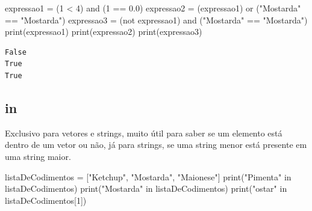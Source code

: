 \documentclass[
  letterpaper,
  DIV=11,
  numbers=noendperiod]{scrreprt}
\newenvironment{Shaded}{\begin{snugshade}}{\end{snugshade}}
\newcommand{\BuiltInTok}[1]{\textcolor[rgb]{0.00,0.23,0.31}{#1}}
\newcommand{\DecValTok}[1]{\textcolor[rgb]{0.68,0.00,0.00}{#1}}
\newcommand{\FloatTok}[1]{\textcolor[rgb]{0.68,0.00,0.00}{#1}}
\newcommand{\KeywordTok}[1]{\textcolor[rgb]{0.00,0.23,0.31}{#1}}
\newcommand{\NormalTok}[1]{\textcolor[rgb]{0.00,0.23,0.31}{#1}}
\newcommand{\OperatorTok}[1]{\textcolor[rgb]{0.37,0.37,0.37}{#1}}
\newcommand{\StringTok}[1]{\textcolor[rgb]{0.13,0.47,0.30}{#1}}
\begin{document}
\begin{Shaded}
\begin{Highlighting}[]
\NormalTok{    expressao1 }\OperatorTok{=}\NormalTok{ (}\DecValTok{1} \OperatorTok{\textless{}} \DecValTok{4}\NormalTok{) }\KeywordTok{and}\NormalTok{ (}\DecValTok{1} \OperatorTok{==} \FloatTok{0.0}\NormalTok{)}
\NormalTok{    expressao2 }\OperatorTok{=}\NormalTok{ (expressao1) }\KeywordTok{or}\NormalTok{ (}\StringTok{"Mostarda"} \OperatorTok{==} \StringTok{"Mostarda"}\NormalTok{)}
\NormalTok{    expressao3 }\OperatorTok{=}\NormalTok{ (}\KeywordTok{not}\NormalTok{ expressao1) }\KeywordTok{and}\NormalTok{ (}\StringTok{"Mostarda"} \OperatorTok{==} \StringTok{"Mostarda"}\NormalTok{)}
    \BuiltInTok{print}\NormalTok{(expressao1)}
    \BuiltInTok{print}\NormalTok{(expressao2)}
    \BuiltInTok{print}\NormalTok{(expressao3)}
\end{Highlighting}
\end{Shaded}

\begin{tcolorbox}[enhanced jigsaw, breakable, leftrule=.75mm, left=2mm, opacityback=0, bottomrule=.15mm, toprule=.15mm, rightrule=.15mm, arc=.35mm, colback=white]

\begin{verbatim}
False
True
True
\end{verbatim}

\end{tcolorbox}

\hypertarget{in}{%
\subsection{in}\label{in}}

Exclusivo para vetores e strings, muito útil para saber se um elemento
está dentro de um vetor ou não, já para strings, se uma string menor
está presente em uma string maior.

\begin{Shaded}
\begin{Highlighting}[]
\NormalTok{    listaDeCodimentos }\OperatorTok{=}\NormalTok{ [}\StringTok{"Ketchup"}\NormalTok{, }\StringTok{"Mostarda"}\NormalTok{, }\StringTok{"Maionese"}\NormalTok{]}
    \BuiltInTok{print}\NormalTok{(}\StringTok{"Pimenta"} \KeywordTok{in}\NormalTok{ listaDeCodimentos)}
    \BuiltInTok{print}\NormalTok{(}\StringTok{"Mostarda"} \KeywordTok{in}\NormalTok{ listaDeCodimentos)}
    \BuiltInTok{print}\NormalTok{(}\StringTok{"ostar"} \KeywordTok{in}\NormalTok{ listaDeCodimentos[}\DecValTok{1}\NormalTok{])}
\end{Highlighting}
\end{Shaded}
\end{document}
